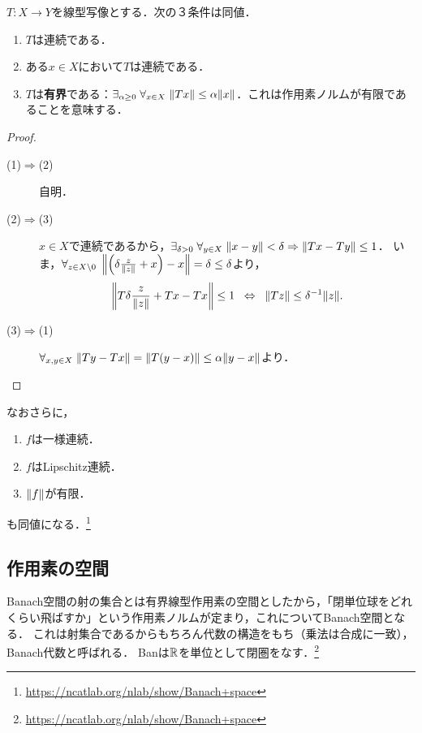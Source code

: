 \documentclass[uplatex,dvipdfmx]{jsreport}
\begin{document}
\begin{proposition}
    $T:X\to Y$を線型写像とする．次の３条件は同値．
    \begin{enumerate}
        \item $T$は連続である．
        \item ある$x\in X$において$T$は連続である．
        \item $T$は\textbf{有界}である：$\exists_{\alpha\ge 0}\;\forall_{x\in X}\;\|Tx\|\le\alpha\|x\|$．これは作用素ノルムが有限であることを意味する．
    \end{enumerate}
\end{proposition}
\begin{proof}\mbox{}
    \begin{description}
        \item[(1)$\Rightarrow$(2)] 自明．
        \item[(2)$\Rightarrow$(3)] $x\in X$で連続であるから，$\exists_{\delta>0}\;\forall_{y\in X}\;\|x-y\|<\delta\Rightarrow\|Tx-Ty\|\le 1$．
        いま，$\forall_{z\in X\setminus 0}\;\left\|\left(\delta\frac{z}{\|z\|}+x\right)-x\right\|=\delta\le\delta$より，
        \[\left\|T\delta\frac{z}{\|z\|}+Tx-Tx\right\|\le 1\;\;\Leftrightarrow\;\;\|Tz\|\le\delta^{-1}\|z\|.\]
        \item[(3)$\Rightarrow$(1)]
        $\forall_{x,y\in X}\;\|Ty-Tx\|=\|T(y-x)\|\le\alpha\|y-x\|$より．
    \end{description}
\end{proof}
\begin{remark}
    なおさらに，
    \begin{enumerate}
        \item $f$は一様連続．
        \item $f$はLipschitz連続．
        \item $\|f\|$が有限．
    \end{enumerate}
    も同値になる．\footnote{\url{https://ncatlab.org/nlab/show/Banach+space}}
\end{remark}

\subsection{作用素の空間}

\begin{tcolorbox}[colframe=ForestGreen, colback=ForestGreen!10!white,breakable,colbacktitle=ForestGreen!40!white,coltitle=black,fonttitle=\bfseries\sffamily,
title=Banには内部homを持つ閉圏としての構造がある]
    Banach空間の射の集合とは有界線型作用素の空間としたから，「閉単位球をどれくらい飛ばすか」という作用素ノルムが定まり，これについてBanach空間となる．
    これは射集合であるからもちろん代数の構造をもち（乗法は合成に一致），Banach代数と呼ばれる．
    Banは$\mathbb{R}$を単位として閉圏をなす．\footnote{\url{https://ncatlab.org/nlab/show/Banach+space}}
\end{tcolorbox}
\end{document}
